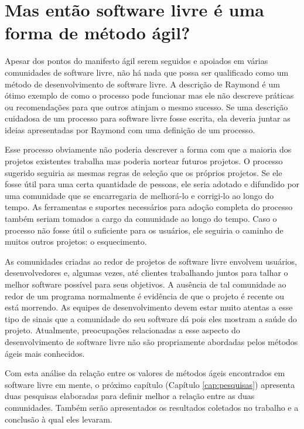 \section{Mas então software livre é uma forma de método ágil?}
\label{sec:agile?}

Apesar dos pontos do manifesto ágil serem seguidos e apoiados em
várias comunidades de software livre, não há nada que possa ser
qualificado como um método de desenvolvimento de software livre. A
descrição de Raymond \cite{Raymond1999} é um ótimo exemplo de como o
processo pode funcionar mas ele não descreve práticas ou recomendações
para que outros atinjam o mesmo sucesso. Se uma descrição cuidadosa de
um processo para software livre fosse escrita, ela deveria juntar as
ideias apresentadas por Raymond com uma definição de um processo.

Esse processo obviamente não poderia descrever a forma com que a
maioria dos projetos existentes trabalha mas poderia nortear futuros
projetos. O processo sugerido seguiria as mesmas regras de seleção que
os próprios projetos. Se ele fosse útil para uma certa quantidade de
pessoas, ele seria adotado e difundido por uma comunidade que se
encarregaria de melhorá-lo e corrigi-lo ao longo do tempo. As
ferramentas e suportes necessários para adoção completa do processo
também seriam tomados a cargo da comunidade ao longo do tempo. Caso o
processo não fosse útil o suficiente para os usuários, ele seguiria o
caminho de muitos outros projetos: o esquecimento.

As comunidades criadas ao redor de projetos de software livre envolvem
usuários, desenvolvedores e, algumas vezes, até clientes trabalhando
juntos para talhar o melhor software possível para seus objetivos. A
ausência de tal comunidade ao redor de um programa normalmente é
evidência de que o projeto é recente ou está morrendo. As equipes de
desenvolvimento devem estar muito atentas a esse tipo de sinais que a
comunidade do seu software dá pois eles mostram a saúde do
projeto. Atualmente, preocupações relacionadas a esse aspecto do
desenvolvimento de software livre não são propriamente abordadas pelos
métodos ágeis mais conhecidos.

Com esta análise da relação entre os valores de métodos ágeis
encontrados em software livre em mente, o próximo capítulo (Capítulo
\ref{cap:pesquisas}) apresenta duas pesquisas elaboradas para definir
melhor a relação entre as duas comunidades. Também serão apresentados
os resultados coletados no trabalho e a conclusão à qual eles levaram.
